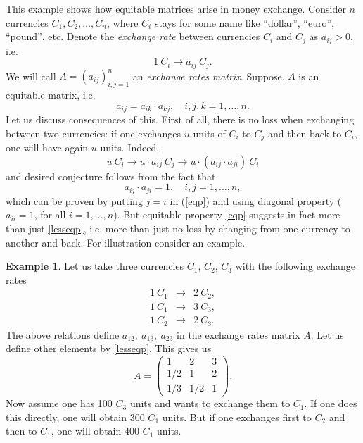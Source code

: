 \documentclass[12pt]{article}
\theoremstyle{definition}
\newtheorem{exm}{Example}
\begin{document}
This example shows how equitable matrices arise in money exchange.
Consider $n$ currencies $C_1,C_2,\ldots,C_n$, where $C_i$ stays for some
name like ``dollar'', ``euro'', ``pound'', etc. Denote the \textit{exchange rate}
between currencies $C_i$ and $C_j$ as $a_{ij}>0$, i.e.
\begin{equation}
1\ C_i \longrightarrow a_{ij}\ C_j.
\label{er}
\end{equation}
We will call $A=(a_{ij})_{i,j=1}^n$ an \textit{exchange rates matrix}.
Suppose, $A$ is an
equitable matrix, i.e.
%
\begin{equation}
    a_{ij} = a_{ik} \cdot a_{kj}, \quad i,j,k=1,\ldots, n.
\label{eqp}
\end{equation}
%
Let us discuss consequences of this. First of all, there is no loss when exchanging
between two currencies: if one exchanges $u$ units of $C_i$ to $C_j$
and then back to $C_i$, one will have again $u$ units. Indeed,
$$
    u\ C_i \longrightarrow u\cdot a_{ij}\ C_j \longrightarrow u\cdot(a_{ij}\cdot a_{ji})\ C_i
$$
and desired conjecture follows from the fact that
%
\begin{equation}
    a_{ij} \cdot a_{ji}=1, \quad i,j=1,\ldots, n,
\label{lesseqp}
\end{equation}
%
which can be proven by putting $j=i$ in (\ref{eqp}) and using diagonal property
($a_{ii}=1$, for all $i=1,\ldots,n$).
But equitable property \eqref{eqp} suggests in fact more than just \eqref{lesseqp}, i.e. more
than just no loss by changing from one currency to another and back. For illustration consider
an example.

\begin{exm}
    Let us take three currencies $C_1$, $C_2$, $C_3$ with the following exchange rates
    \begin{eqnarray*}
        1\ C_1 & \longrightarrow & 2\ C_2,\\
        1\ C_1 & \longrightarrow & 3\ C_3,\\
        1\ C_2 & \longrightarrow & 2\ C_3.
    \end{eqnarray*}
    The above relations define $a_{12},\ a_{13},\ a_{23}$ in the exchange rates matrix $A$.
    Let us define other elements by \eqref{lesseqp}. This gives us
    $$
    A=\left(
        \begin{array}{ccc}
            1 & 2 & 3\\
            1/2 & 1 & 2\\
            1/3 & 1/2 & 1
        \end{array}
        \right).
    $$
    Now assume one has 100 $C_3$ units and wants to exchange them to $C_1$. If one does this
    directly, one will obtain 300 $C_1$ units. But if one exchanges first to $C_2$ and then
    to $C_1$, one will obtain 400 $C_1$ units.
\end{exm}
\end{document}
